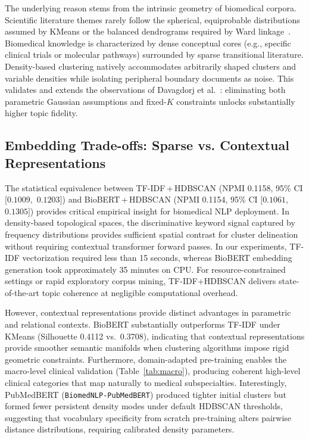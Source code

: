 \documentclass[a4paper,fleqn]{cas-dc}
\begin{document}
The underlying reason stems from the intrinsic geometry of biomedical corpora. Scientific literature themes rarely follow the spherical, equiprobable distributions assumed by KMeans or the balanced dendrograms required by Ward linkage~\cite{ref25}. Biomedical knowledge is characterized by dense conceptual cores (e.g., specific clinical trials or molecular pathways) surrounded by sparse transitional literature. Density-based clustering natively accommodates arbitrarily shaped clusters and variable densities while isolating peripheral boundary documents as noise. This validates and extends the observations of Davagdorj et al.~\cite{ref15}: eliminating both parametric Gaussian assumptions and fixed-$K$ constraints unlocks substantially higher topic fidelity.

\subsection{Embedding Trade-offs: Sparse vs. Contextual Representations}

The statistical equivalence between TF-IDF\,+\allowbreak\,HDBSCAN (NPMI 0.1158, 95\% CI $[0.1009,$ $0.1203]$) and BioBERT\,+\allowbreak\,HDBSCAN (NPMI 0.1154, 95\% CI $[0.1061,$ $0.1305]$) provides critical empirical insight for biomedical NLP deployment. In density-based topological spaces, the discriminative keyword signal captured by frequency distributions provides sufficient spatial contrast for cluster delineation without requiring contextual transformer forward passes. In our experiments, TF-IDF vectorization required less than 15 seconds, whereas BioBERT embedding generation took approximately 35 minutes on CPU. For resource-constrained settings or rapid exploratory corpus mining, TF-IDF+HDBSCAN delivers state-of-the-art topic coherence at negligible computational overhead.

However, contextual representations provide distinct advantages in parametric and relational contexts. BioBERT substantially outperforms TF-IDF under KMeans (Silhouette 0.4112 vs.\ 0.3708), indicating that contextual representations provide smoother semantic manifolds when clustering algorithms impose rigid geometric constraints. Furthermore, domain-adapted pre-training enables the macro-level clinical validation (Table~\ref{tab:macro}), producing coherent high-level clinical categories that map naturally to medical subspecialties. Interestingly, PubMedBERT (\texttt{BiomedNLP-\allowbreak PubMedBERT}) produced tighter initial clusters but formed fewer persistent density modes under default HDBSCAN thresholds, suggesting that vocabulary specificity from scratch pre-training alters pairwise distance distributions, requiring calibrated density parameters.
\end{document}
